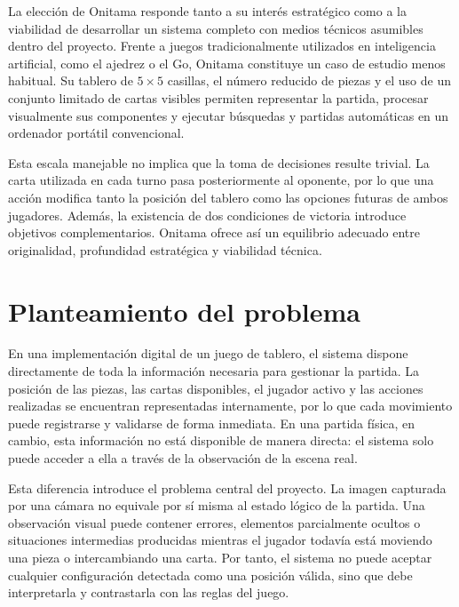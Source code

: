 La elección de Onitama responde tanto a su interés estratégico como a la viabilidad de desarrollar un sistema completo con medios técnicos asumibles dentro del proyecto. Frente a juegos tradicionalmente utilizados en inteligencia artificial, como el ajedrez o el Go, Onitama constituye un caso de estudio menos habitual. Su tablero de \(5 \times 5\) casillas, el número reducido de piezas y el uso de un conjunto limitado de cartas visibles permiten representar la partida, procesar visualmente sus componentes y ejecutar búsquedas y partidas automáticas en un ordenador portátil convencional.

Esta escala manejable no implica que la toma de decisiones resulte trivial. La carta utilizada en cada turno pasa posteriormente al oponente, por lo que una acción modifica tanto la posición del tablero como las opciones futuras de ambos jugadores. Además, la existencia de dos condiciones de victoria introduce objetivos complementarios. Onitama ofrece así un equilibrio adecuado entre originalidad, profundidad estratégica y viabilidad técnica.


\section{Planteamiento del problema}
\label{sec:planteamiento-problema}

En una implementación digital de un juego de tablero, el sistema dispone directamente de toda la información necesaria para gestionar la partida. La posición de las piezas, las cartas disponibles, el jugador activo y las acciones realizadas se encuentran representadas internamente, por lo que cada movimiento puede registrarse y validarse de forma inmediata. En una partida física, en cambio, esta información no está disponible de manera directa: el sistema solo puede acceder a ella a través de la observación de la escena real.

Esta diferencia introduce el problema central del proyecto. La imagen capturada por una cámara no equivale por sí misma al estado lógico de la partida. Una observación visual puede contener errores, elementos parcialmente ocultos o situaciones intermedias producidas mientras el jugador todavía está moviendo una pieza o intercambiando una carta. Por tanto, el sistema no puede aceptar cualquier configuración detectada como una posición válida, sino que debe interpretarla y contrastarla con las reglas del juego.


